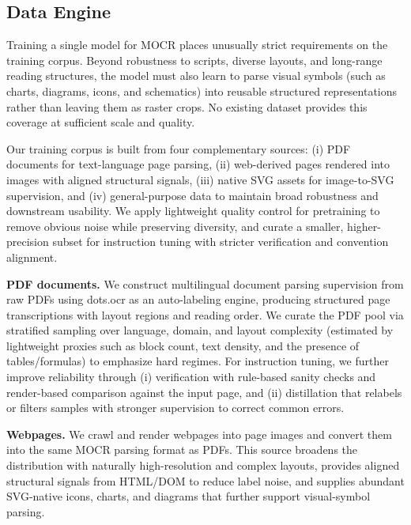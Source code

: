 \documentclass{article}
\begin{document}
\subsection{Data Engine}
\label{sec:data_engine}
    Training a single model for MOCR places unusually strict requirements on the training corpus. Beyond robustness to scripts, diverse layouts, and long-range reading structures, the model must also learn to parse visual symbols (such as charts, diagrams, icons, and schematics) into reusable structured representations rather than leaving them as raster crops. No existing dataset provides this coverage at sufficient scale and quality.

    Our training corpus is built from four complementary sources: (i) PDF documents for text-language page parsing, (ii) web-derived pages rendered into images with aligned structural signals, (iii) native SVG assets for image-to-SVG supervision, and (iv) general-purpose data to maintain broad robustness and downstream usability. We apply lightweight quality control for pretraining to remove obvious noise while preserving diversity, and curate a smaller, higher-precision subset for instruction tuning with stricter verification and convention alignment.


    \textbf{PDF documents.} We construct multilingual document parsing supervision from raw PDFs using dots.ocr as an auto-labeling engine, producing structured page transcriptions with layout regions and reading order. We curate the PDF pool via stratified sampling over language, domain, and layout complexity (estimated by lightweight proxies such as block count, text density, and the presence of tables/formulas) to emphasize hard regimes. For instruction tuning, we further improve reliability through (i) verification with rule-based sanity checks and render-based comparison against the input page, and (ii) distillation that relabels or filters samples with stronger supervision to correct common errors.

    \textbf{Webpages.} We crawl and render webpages into page images and convert them into the same MOCR parsing format as PDFs. This source broadens the distribution with naturally high-resolution and complex layouts, provides aligned structural signals from HTML/DOM to reduce label noise, and supplies abundant SVG-native icons, charts, and diagrams that further support visual-symbol parsing.
\end{document}
